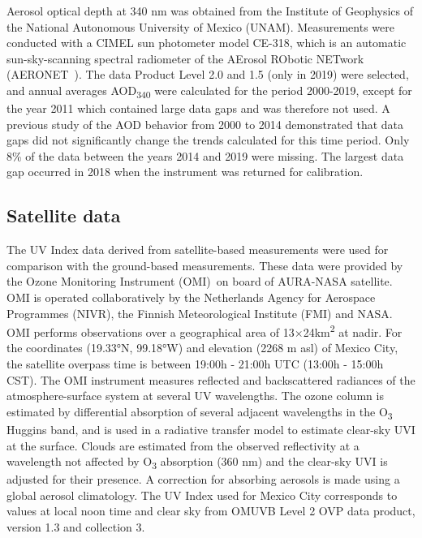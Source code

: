 \documentclass[journal=jacsat,manuscript=article]{achemso}
\begin{document}
Aerosol optical depth at 340 nm was obtained from the Institute of
Geophysics of the National Autonomous University of Mexico (UNAM).
Measurements were conducted with a CIMEL sun photometer model CE-318,
which is an automatic sun-sky-scanning spectral radiometer of
the AErosol RObotic NETwork (AERONET~\citep{Holben_1998}). The data
Product Level 2.0 and 1.5 (only in 2019) were selected, and annual
averages AOD\textsubscript{340} were calculated for the period 2000-2019,
except for the year 2011 which contained large data gaps and was therefore not used.
A previous study of the AOD behavior from 2000 to 2014 demonstrated that data gaps did not
significantly change the trends calculated for this time period.\citep{Carabali_2017}
Only 8\% of the data between the years 2014 and 2019 were missing.
The largest data gap occurred in 2018 when the instrument was returned for calibration.


\subsection{Satellite data}

The UV Index data derived from satellite-based measurements
were used for comparison with the ground-based measurements.
These data were provided by the Ozone Monitoring
Instrument (OMI)~on board of AURA-NASA satellite.\citep{dcio} OMI
is operated collaboratively by the Netherlands Agency for Aerospace
Programmes (NIVR), the Finnish Meteorological Institute (FMI) and NASA.
OMI performs observations over a geographical area of 13$\times$24km\textsuperscript{2} at nadir. For
the coordinates (19.33°N, 99.18°W) and elevation (2268 m asl) of Mexico City,
the satellite overpass time is between 19:00h - 21:00h UTC (13:00h - 15:00h CST).
The OMI instrument measures reflected and backscattered radiances of the atmosphere-surface system at several UV wavelengths.\cite{Tanskanen_2006} The ozone column is estimated by differential absorption of several adjacent
wavelengths in the O\textsubscript{3} Huggins band\citep{Veefkind_2006}, and is used in a radiative transfer model to estimate clear-sky UVI at the surface. Clouds are estimated from the observed reflectivity at a wavelength not affected by O\textsubscript{3} absorption (360 nm) and the clear-sky UVI is adjusted for their presence.\cite{Tanskanen_2007} A correction for absorbing aerosols is made using a global aerosol climatology.\citep{Arola_2009}
The UV Index used for Mexico City corresponds to values at local noon time and clear sky
from OMUVB Level 2 OVP data product, version 1.3 and collection 3.
\end{document}
